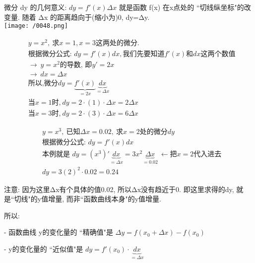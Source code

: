 \documentclass[UTF8]{ctexart}
\begin{document}
	微分 dy 的几何意义:  $dy=f'\left( x \right) \varDelta x$ 就是函数 f(x) 在x点处的 ``切线纵坐标"的改变量. 随着 Δx 的距离趋向于(缩小为)0, dy=Δy. \\
	
	\texttt{[image: /0048.png]}	\\
	
	
	\begin{myEnvSample}
		\begin{align*}
	&y=x^2,\ \text{求}x=1,x=3\text{这两处的微分}.\\
&\text{根据微分公式:\ }dy=f'\left( x \right) dx,\text{我们先要知道}f'\left( x \right) \text{和}dx\text{这两个数值}\\
&\rightarrow \ y=x^2\text{的导数, 即}y'=2x\\
&\rightarrow \ dx=\varDelta x\\
&\text{所以,微分}dy=\underset{=2x}{\underbrace{f'\left( x \right) }}\underset{=\varDelta x}{\underbrace{dx}}\\
&\text{当}x=1\text{时,} \ dy=2\cdot \left( 1 \right) \cdot \varDelta x=2\varDelta x\\
&\text{当}x=3\text{时,} \ dy=2\cdot \left( 3 \right) \cdot \varDelta x=6\varDelta x
		\end{align*}
	\end{myEnvSample}
	
	
	\begin{myEnvSample}
		\begin{align*}
	&y=x^3,\ \text{已知}\varDelta x=0.02,\ \text{求}x=2\text{处的微分}dy\\
&\text{根据微分公式:\ }dy=f'\left( x \right) dx\\
&\text{本例就是\ }dy=\left( x^3 \right) '\underset{=\varDelta x}{\underbrace{dx}}=3x^2\underset{=0.02}{\underbrace{\varDelta x}}\ \gets \text{把}x=2\text{代入进去}\\
&dy=3\left( 2 \right) ^2\cdot 0.02=0.24
		\end{align*}
	
	注意: 因为这里Δx有个具体的值0.02, 所以Δx没有趋近于0. 即这里求得的dy, 就是``切线"的y值增量, 而非``函数曲线本身"的y值增量.
	\end{myEnvSample}
	
	
	所以:
	
	- 函数曲线 y的变化量的 ``精确值"是 $\Delta y = f(x_0 + \Delta x) - f(x_0)$
	
	- y的变化量的 ``近似值"是 $dy=f'\left( x_0 \right) \cdot \underset{=\varDelta x}{\underbrace{dx}}$
	
\end{document}
